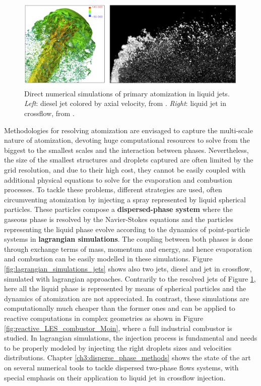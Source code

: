 \begin{figure}[h!]
	\centering
   \includegraphics[scale=0.4]{./part0_intro/jets_DNS_simulations}
   \vspace*{-0.15in}
	\caption[Direct numerical simulations of primary atomization in liquid jets.]{Direct numerical simulations of primary atomization in liquid jets. \textsl{Left}: diesel jet colored by axial velocity, from . \textsl{Right}: liquid jet in crossflow, from .}
	\label{fig:DNS_simulations_jets}
\end{figure}

Methodologies for resolving atomization are envisaged to capture the multi-scale nature of atomization, devoting huge computational resources to solve from the biggest to the smallest scales and the interaction between phases. Nevertheless, the size of the smallest structures and droplets captured are often limited by the grid resolution, and due to their high cost, they cannot be easily coupled with additional physical equations to solve for the evaporation and combustion processes. To tackle these problems, different strategies are used, often circumventing atomization by injecting a spray represented by liquid spherical particles. These particles compose a \textbf{dispersed-phase system} where the gaseous phase is resolved by the Navier-Stokes equations and the particles representing the liquid phase evolve according to the dynamics of point-particle systems in \textbf{lagrangian simulations}. The coupling between both phases is done through exchange terms of mass, momentum and energy, and hence evaporation and combustion can be easily modelled in these simulations. Figure \ref{fig:lagrangian_simulations_jets} shows also two jets, diesel and jet in crossflow, simulated with lagrangian approaches. Contrarily to the resolved jets of Figure \ref{fig:DNS_simulations_jets}, here all the liquid phase is represented by means of spherical particles and the dynamics of atomization are not appreciated. In contrast, these simulations are computationally much cheaper than the former ones and can be applied to reactive computations in complex geometries as shown in Figure \ref{fig:reactive_LES_combustor_Moin}, where a full industrial combustor is studied. In lagrangian simulations, the injection process is fundamental and needs to be properly modeled by injecting the right droplets sizes and velocities distributions. Chapter \ref{ch3:disperse_phase_methods} shows the state of the art on several numerical tools to tackle dispersed two-phase flows systems, with special emphasis on their application to liquid jet in crossflow injection.

